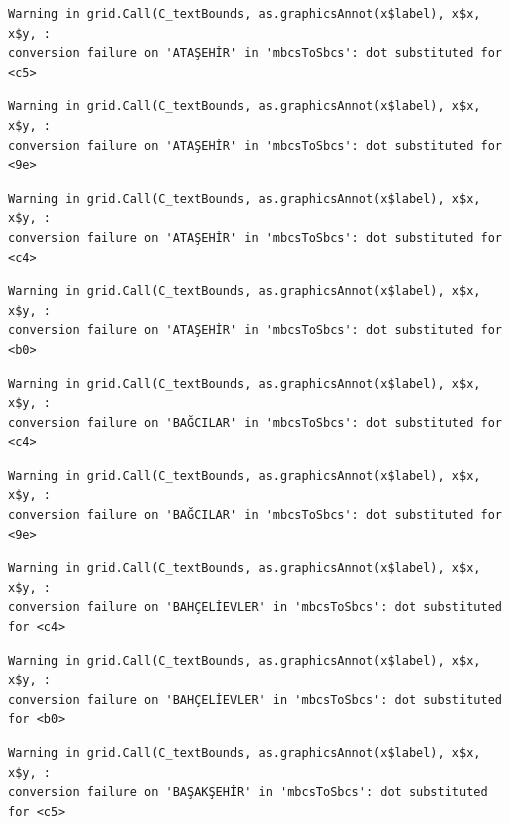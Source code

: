 \documentclass[
  11pt,
  a4paper,
  DIV=11,
  numbers=noendperiod]{scrartcl}
\begin{document}
\begin{verbatim}
Warning in grid.Call(C_textBounds, as.graphicsAnnot(x$label), x$x, x$y, :
conversion failure on 'ATAŞEHİR' in 'mbcsToSbcs': dot substituted for <c5>
\end{verbatim}

\begin{verbatim}
Warning in grid.Call(C_textBounds, as.graphicsAnnot(x$label), x$x, x$y, :
conversion failure on 'ATAŞEHİR' in 'mbcsToSbcs': dot substituted for <9e>
\end{verbatim}

\begin{verbatim}
Warning in grid.Call(C_textBounds, as.graphicsAnnot(x$label), x$x, x$y, :
conversion failure on 'ATAŞEHİR' in 'mbcsToSbcs': dot substituted for <c4>
\end{verbatim}

\begin{verbatim}
Warning in grid.Call(C_textBounds, as.graphicsAnnot(x$label), x$x, x$y, :
conversion failure on 'ATAŞEHİR' in 'mbcsToSbcs': dot substituted for <b0>
\end{verbatim}

\begin{verbatim}
Warning in grid.Call(C_textBounds, as.graphicsAnnot(x$label), x$x, x$y, :
conversion failure on 'BAĞCILAR' in 'mbcsToSbcs': dot substituted for <c4>
\end{verbatim}

\begin{verbatim}
Warning in grid.Call(C_textBounds, as.graphicsAnnot(x$label), x$x, x$y, :
conversion failure on 'BAĞCILAR' in 'mbcsToSbcs': dot substituted for <9e>
\end{verbatim}

\begin{verbatim}
Warning in grid.Call(C_textBounds, as.graphicsAnnot(x$label), x$x, x$y, :
conversion failure on 'BAHÇELİEVLER' in 'mbcsToSbcs': dot substituted for <c4>
\end{verbatim}

\begin{verbatim}
Warning in grid.Call(C_textBounds, as.graphicsAnnot(x$label), x$x, x$y, :
conversion failure on 'BAHÇELİEVLER' in 'mbcsToSbcs': dot substituted for <b0>
\end{verbatim}

\begin{verbatim}
Warning in grid.Call(C_textBounds, as.graphicsAnnot(x$label), x$x, x$y, :
conversion failure on 'BAŞAKŞEHİR' in 'mbcsToSbcs': dot substituted for <c5>
\end{verbatim}
\end{document}
